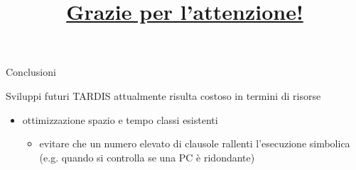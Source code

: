 \documentclass{beamer}
\begin{document}
\begin{frame}{Conclusioni}
    \vspace{5mm}
    \begin{block}{Sviluppi futuri}
        TARDIS attualmente risulta costoso in termini di risorse
        \begin{itemize}
            \item ottimizzazione spazio e tempo classi esistenti
            \begin{itemize}
                \item evitare che un numero elevato di clausole rallenti l'esecuzione simbolica (e.g. quando si controlla se una PC è ridondante)
            \end{itemize}
        \end{itemize}
    \end{block}
\end{frame}

\begingroup
{}
\title{\Huge{{\underline{Grazie per l'attenzione!}}}}
\institute{}
\begin{frame}[noframenumbering]
  \titlepage
\end{frame}
\endgroup
\end{document}
